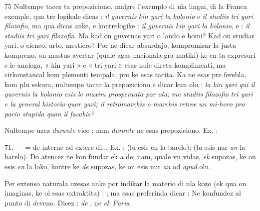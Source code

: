 \begin{VUpage}[79]{75}
Nultempe tacez ta prepoziciono, malgre l'exemplo di ula\nl
lingui, di la Franca exemple, qua tre logikale dicas : \textit{il}\nl
\textit{guvernis}  \textit{kin yari la kolonio} e \textit{il studiis}  \textit{tri yari}\nl
\textit{filozofio}, ma qua dicas anke, e kontrelogike : \textit{il guvernis kin}\nl
\textit{yari la kolonio}, e : \textit{il studiis tri yari filozofio}. Ma kad on\nl
guvernas yari o lando e homi? Kad on studias yari, o cienco,\nl
arto, mestiero? Por ne dicar absurdajo, kompromisar la justa\nl
kompreno, on mustus avertar (quale agas nacionala gra\cc
matiki) ke en ta expresuri e le analoga, « kin yari » e « tri\nl
yari » esas nule direta komplimenti, ma cirkonstancal kom\cc
plementi tempala, pro ke  esas tacita. Ka ne esas pre\cc
ferebla, kom plu sekura, nultempe tacar la prepoziciono e\nl
dicar kun olu : \textit{la kin yari}  \textit{qui il guvernis la kolonio}\nl
\textit{esis le maxim prosperanta por olu; me studiis filozofio} \nl
\textit{tri yari e la general historio}  \textit{quar yari; il retromarchis}\nl
\textit{o marchis retroe}  \textit{un mi-horo pro pario stupida quan}\nl
\textit{il facabis?}

Nultempe uzez \textit{durante} vice ; nam \textit{durante} ne esas\nl
prepoziciono. Ex. : \nl
{}

\VUblanc{6.37pt}%
71. ---  = de interne ad extere di... Ex. : \nl
{} (lu esis en la barelo); \nl
{} (lu esis nur \textit{an} la barelo). Do atencez ne kon\cc
fundar ek a de; nam, quale vu vidas, \textit{ek} supozas, ke on esis\nl
\textit{en} la loko, kontre ke \textit{de} supozas, ke on esis nur \textit{an} od\nl
\textit{apud} olu.

Per extenso naturala  uzesas anke por indikar la materio\nl
di ula kozo (ek qua on imaginas, ke ol esas extraktita) : \nl
{}; ma esas preferinda dicar : \cc
{}\nl
{} Ne konfundez  al punto di \textit{de}veno. Dicez :\nl
{} \textit{de} , ne \textit{ek Paris}.


\end{VUpage}
